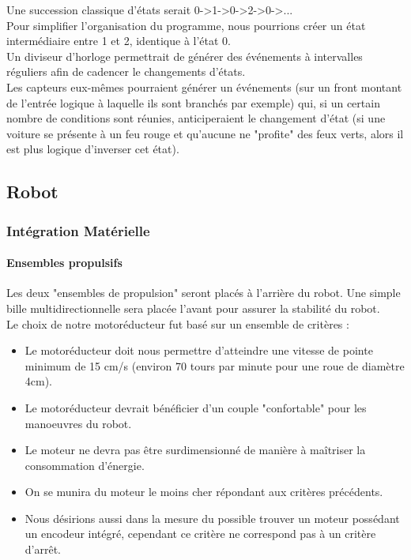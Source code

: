 		\vspace {12pt}
		Une succession classique d'états serait 0->1->0->2->0->...\\
		Pour simplifier l'organisation du programme, nous pourrions créer un état intermédiaire entre 1 et 2, identique à l'état 0.\\

		Un diviseur d'horloge permettrait de générer des événements à intervalles réguliers afin de cadencer le changements d'états.\\
		Les capteurs eux-mêmes pourraient générer un événements (sur un front montant de l'entrée logique à laquelle ils sont branchés par exemple) qui, si un certain nombre de conditions sont réunies, anticiperaient le changement d'état (si une voiture se présente à un feu rouge et qu'aucune ne "profite" des feux verts, alors il est plus logique d'inverser cet état).

\subsection{Robot}

	\subsubsection{Intégration Matérielle}

		\paragraph{Ensembles propulsifs}

			Les deux "ensembles de propulsion" seront placés à l'arrière du robot. Une simple bille multidirectionnelle sera placée l'avant pour assurer la stabilité du robot.\\

			Le choix de notre motoréducteur fut basé sur un ensemble de critères :
			\begin{itemize}
				\item Le motoréducteur doit nous permettre d’atteindre une vitesse de pointe minimum de 15 cm/s (environ 70 tours par minute pour une roue de diamètre 4cm).
				\item Le motoréducteur devrait bénéficier d'un couple "confortable" pour les manoeuvres du robot.
				\item Le moteur ne devra pas être surdimensionné de manière à maîtriser la consommation d’énergie.
				\item On se munira du moteur le moins cher répondant aux critères précédents.
				\item Nous désirions aussi dans la mesure du possible trouver un moteur possédant un encodeur intégré, cependant ce critère ne correspond pas à un critère d’arrêt.
			\end{itemize}

